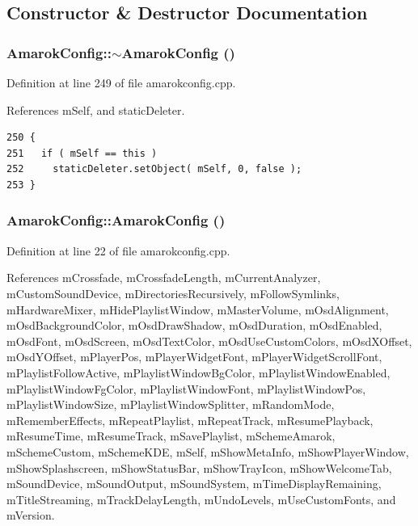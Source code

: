 \subsection{Constructor \& Destructor Documentation}
\subsubsection{\setlength{\rightskip}{0pt plus 5cm}Amarok\-Config::$\sim${\bf Amarok\-Config} ()}\label{classAmarokConfig_AmarokConfiga0}




Definition at line 249 of file amarokconfig.cpp.

References m\-Self, and static\-Deleter.



\footnotesize\begin{verbatim}250 {
251   if ( mSelf == this )
252     staticDeleter.setObject( mSelf, 0, false );
253 }
\end{verbatim}\normalsize 
{}
\subsubsection{\setlength{\rightskip}{0pt plus 5cm}Amarok\-Config::Amarok\-Config ()\hspace{0.3cm}{\tt  [protected]}}\label{classAmarokConfig_AmarokConfigb0}




Definition at line 22 of file amarokconfig.cpp.

References m\-Crossfade, m\-Crossfade\-Length, m\-Current\-Analyzer, m\-Custom\-Sound\-Device, m\-Directories\-Recursively, m\-Follow\-Symlinks, m\-Hardware\-Mixer, m\-Hide\-Playlist\-Window, m\-Master\-Volume, m\-Osd\-Alignment, m\-Osd\-Background\-Color, m\-Osd\-Draw\-Shadow, m\-Osd\-Duration, m\-Osd\-Enabled, m\-Osd\-Font, m\-Osd\-Screen, m\-Osd\-Text\-Color, m\-Osd\-Use\-Custom\-Colors, m\-Osd\-XOffset, m\-Osd\-YOffset, m\-Player\-Pos, m\-Player\-Widget\-Font, m\-Player\-Widget\-Scroll\-Font, m\-Playlist\-Follow\-Active, m\-Playlist\-Window\-Bg\-Color, m\-Playlist\-Window\-Enabled, m\-Playlist\-Window\-Fg\-Color, m\-Playlist\-Window\-Font, m\-Playlist\-Window\-Pos, m\-Playlist\-Window\-Size, m\-Playlist\-Window\-Splitter, m\-Random\-Mode, m\-Remember\-Effects, m\-Repeat\-Playlist, m\-Repeat\-Track, m\-Resume\-Playback, m\-Resume\-Time, m\-Resume\-Track, m\-Save\-Playlist, m\-Scheme\-Amarok, m\-Scheme\-Custom, m\-Scheme\-KDE, m\-Self, m\-Show\-Meta\-Info, m\-Show\-Player\-Window, m\-Show\-Splashscreen, m\-Show\-Status\-Bar, m\-Show\-Tray\-Icon, m\-Show\-Welcome\-Tab, m\-Sound\-Device, m\-Sound\-Output, m\-Sound\-System, m\-Time\-Display\-Remaining, m\-Title\-Streaming, m\-Track\-Delay\-Length, m\-Undo\-Levels, m\-Use\-Custom\-Fonts, and m\-Version.


